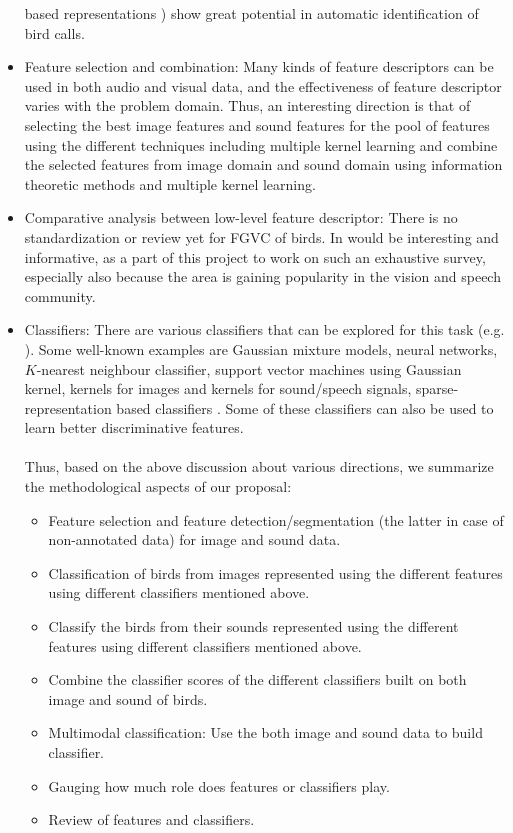 \documentclass{article}
\begin{document}
\begin{itemize}
based representations \cite{padmanAllPoleGDelay, hegdeModgdf}) show great potential in
automatic identification of bird calls.
\item Feature selection and combination: Many kinds of feature descriptors can be used in both audio and visual data, and the effectiveness of feature descriptor varies with the problem domain. Thus, an interesting direction is that of selecting the best image features and sound features for the pool of features using the different techniques including multiple kernel learning and combine the selected features from image domain and sound domain using information theoretic methods and multiple kernel learning. 
\item Comparative analysis between low-level feature descriptor: There is no standardization or review yet for FGVC of birds. In would be interesting and informative, as a part of this project to work on such an exhaustive survey, especially also because the area is gaining popularity in the vision and speech community.
\item Classifiers: There are various classifiers that can be explored for this task (e.g. \cite{duda}). Some well-known examples are Gaussian mixture models, neural networks, $K$-nearest neighbour classifier, support vector machines using Gaussian kernel, kernels for images and kernels for sound/speech signals, sparse-representation based classifiers \cite{sparse,sparse1}. Some of these classifiers can also be used to learn better discriminative features. \ \\ \ \\
Thus, based on the above discussion about various directions, we summarize the methodological aspects of our proposal: 
\begin{itemize}
		\item Feature selection and feature detection/segmentation (the latter in case of non-annotated data) for image and sound data. 
    \item Classification of birds from images represented using the different features using different classifiers mentioned above.  
    \item Classify the birds from their sounds represented using the different features using different classifiers mentioned above. 
    \item Combine the classifier scores of the different classifiers built on both image and sound of birds.
    \item Multimodal classification: Use the both image and sound data to build classifier.
    \item Gauging how much role does features or classifiers play.
    \item Review of features and classifiers.
\end{itemize}
\end{itemize}
\end{document}
